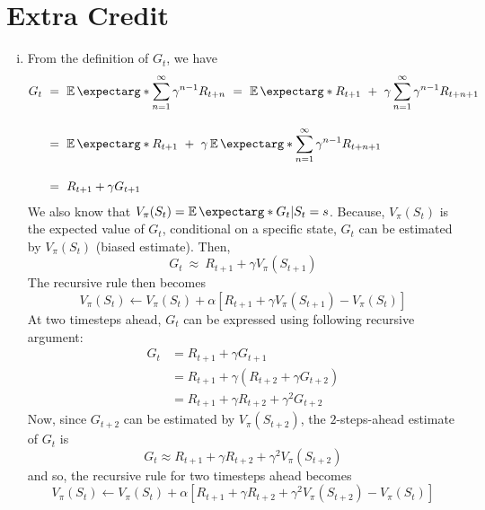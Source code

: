 \documentclass[twoside,11pt]{homework}
\DeclarePairedDelimiter{\2norm}{\lVert}{\rVert^2_2}
\newcommand{\1}[1]{\mathds{1}\left[#1\right]}
\newcommand{\expect}{\operatorname{\mathbb{E}}\expectarg}
\begin{document}
\section*{Extra Credit}
\begin{enumerate}[i)] 
\item  From the definition of $G_t$, we have
\begin{align*} 
G_t \ & = \ \expect*{\sum_{n=1}^{\infty} \gamma^{n-1}R_{t+n}} \ = \ \expect*{R_{t+1} \ + \ \gamma\sum_{n=1}^{\infty} \gamma^{n-1}R_{t+n+1}} \\[1em]
& = \ \expect*{R_{t+1}} \ + \ \gamma\expect*{\sum_{n=1}^{\infty} \gamma^{n-1}R_{t+n+1}}\\[1em]
& = \ R_{t+1}  + \gamma G_{t+1}
\end{align*}
We also know that $V_{\pi}(S_t) = \expect*{G_t | S_t = s}$. Because, $V_{\pi}(S_t)$ is the expected value of $G_t$, conditional on a specific state,  $G_t$ can be estimated by $V_{\pi}(S_t)$ (biased estimate). Then,
$$G_t \ \approx \ R_{t+1}  + \gamma V_{\pi}(S_{t+1})$$
The recursive rule then becomes 
$$V_{\pi}(S_t) \longleftarrow V_{\pi}(S_t) + \alpha[R_{t+1}  + \gamma V_{\pi}(S_{t+1}) - V_{\pi}(S_t)]$$
At two timesteps ahead, $G_t$ can be expressed using following recursive argument:
\begin{align*}
G_t & = R_{t+1}  + \gamma G_{t+1}\\
& = R_{t+1}  + \gamma(R_{t+2}  + \gamma G_{t+2})\\
& = R_{t+1}  + \gamma R_{t+2}  + \gamma^2 G_{t+2}
\end{align*}
Now, since $G_{t+2}$ can be estimated by $V_{\pi}(S_{t+2})$, the $2$-steps-ahead estimate of $G_t$ is
$$G_t \approx R_{t+1}  + \gamma R_{t+2}  + \gamma^2 V_{\pi}(S_{t+2})$$
and so, the recursive rule for two timesteps ahead becomes
$$V_{\pi}(S_t) \longleftarrow V_{\pi}(S_t) + \alpha[R_{t+1}  + \gamma R_{t+2}  + \gamma^2 V_{\pi}(S_{t+2})- V_{\pi}(S_t)]$$


\end{enumerate}
\end{document}
